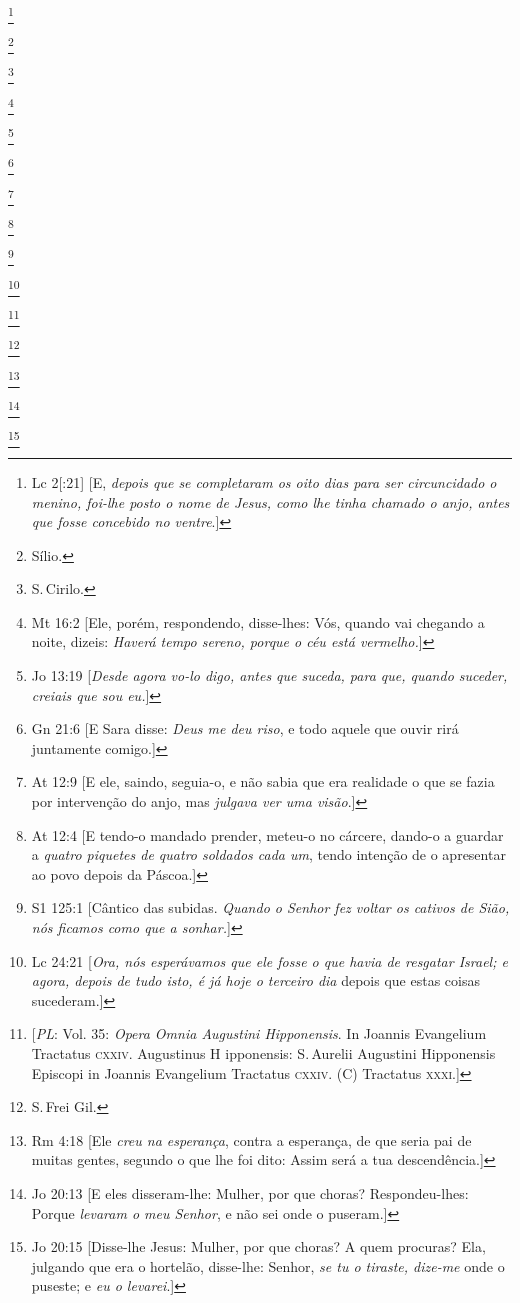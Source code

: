 

\footnote{Lc 2[:21] [E, \textit{depois que se completaram os oito dias para ser circuncidado o menino, foi-lhe posto o nome de Jesus, como lhe tinha chamado o anjo, antes que fosse concebido no ventre}.]}

\footnote{Sílio.}

\footnote{S.\,Cirilo.}

\footnote{Mt 16:2 [Ele, porém, respondendo, disse-lhes: Vós, quando vai chegando a noite, dizeis: \textit{Haverá tempo sereno, porque o céu está vermelho.}]}

\footnote{Jo 13:19 [\textit{Desde agora vo-lo digo, antes que suceda, para que, quando suceder, creiais que sou eu.}]}

\footnote{Gn 21:6 [E Sara disse: \textit{Deus me deu riso}, e todo aquele que ouvir rirá juntamente comigo.]}

\footnote{At 12:9 [E ele, saindo, seguia-o, e não sabia que era realidade o que se fazia por intervenção do anjo, mas \textit{julgava ver uma visão}.]}

\footnote{At 12:4 [E tendo-o mandado prender, meteu-o no cárcere, dando-o a guardar a \textit{quatro piquetes de quatro soldados cada um}, tendo intenção de o apresentar ao povo depois da Páscoa.]}

\footnote{S1 125:1 [Cântico das subidas. \textit{Quando o Senhor fez voltar os cativos de Sião, nós ficamos como que a sonhar.}]}

\footnote{Lc 24:21 [\textit{Ora, nós esperávamos que ele fosse o que havia de resgatar Israel; e agora, depois de tudo isto, é já hoje o terceiro dia} depois que estas coisas sucederam.]}

\footnote{[\textit{PL}: Vol. 35: \textit{Opera Omnia Augustini Hipponensis}. In Joannis Evangelium Tractatus \textsc{cxxiv}. Augustinus H ipponensis: S.\,Aurelii Augustini Hipponensis Episcopi in Joannis Evangelium Tractatus \textsc{cxxiv}. (C) Tractatus \textsc{xxxi}.]}


\footnote{S.\,Frei Gil.}

\footnote{Rm 4:18 [Ele \textit{creu na esperança}, contra a esperança, de que seria pai de muitas gentes, segundo o que lhe foi dito: Assim será a tua descendência.]}

\footnote{Jo 20:13 [E eles disseram-lhe: Mulher, por que choras? Respondeu-lhes: Porque \textit{levaram o meu Senhor}, e não sei onde o puseram.]}

\footnote{Jo 20:15 [Disse-lhe Jesus: Mulher, por que choras? A quem procuras? Ela, julgando que era o hortelão, disse-lhe: Senhor, \textit{se tu o tiraste, dize-me} onde o puseste; e \textit{eu o levarei}.]}

